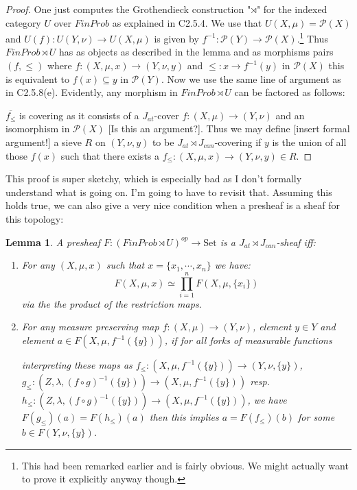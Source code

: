 \documentclass[a4paper]{amsproc}
\theoremstyle{plain}
\newtheorem{lemma}[theorem]{Lemma}
\theoremstyle{definition}
\theoremstyle{remark}
\numberwithin{equation}{section}
\begin{document}
\begin{proof}
One just computes the Grothendieck construction "$\rtimes$" for the indexed category $U$ over $FinProb$ as explained in C2.5.4. We use that $U(X,\mu)=\mathcal{P}(X)$ and $U(f):U(Y,\nu)\rightarrow U(X,\mu)$ is given by $f^{-1}:\mathcal{P}(Y)\rightarrow \mathcal{P}(X)$.\footnote{This had been remarked earlier and is fairly obvious. We might actually want to prove it explicitly anyway though.} Thus $FinProb\rtimes U$ has as objects as described in the lemma and as morphisms pairs $(f,\leq)$ where $f:(X,\mu, x)\rightarrow (Y,\nu, y)$ and $\leq: x\rightarrow f^{-1}(y)$ in $\mathcal{P}(X)$ this is equivalent to $f(x)\subseteq y$ in $\mathcal{P}(Y)$. Now we use the same line of argument as in C2.5.8(e). Evidently, any morphism in $FinProb\rtimes U$ can be factored as follows:
\begin{center}
\end{center} 
$\overline{f_{\leq}}$ is covering as it consists of a $J_{at}$-cover $f:(X,\mu)\rightarrow (Y,\nu)$ and an isomorphism in $\mathcal{P}(X)$ [Is this an argument?]. Thus we may define [insert formal argument!] a sieve $R$ on $(Y,\nu,y)$ to be $J_{at}\rtimes J_{can}$-covering if $y$ is the union of all those $f(x)$ such that there exists a $f_{\leq}:(X,\mu,x)\rightarrow (Y,\nu,y)\in R$.
\end{proof}
This proof is super sketchy, which is especially bad as I don't formally understand what is going on. I'm going to have to revisit that. Assuming this holds true, we can also give a very nice condition when a presheaf is a sheaf for this topology:
\begin{lemma} A presheaf $F:(FinProb\rtimes U)^{op}\rightarrow \text{Set}$ is a $J_{at}\rtimes J_{can}$-sheaf iff:
\begin{enumerate}
\item For any $(X,\mu,x)$ such that $x=\{x_1,\cdots, x_n \}$ we have:
\[F(X,\mu,x)\simeq \prod_{i=1}^n F(X,\mu,\{x_ i \})   \]
via the the product of the restriction maps.
\item For any measure preserving map $f:(X,\mu)\rightarrow (Y,\nu)$, element $y\in Y$ and element $a\in F(X,\mu, f^{-1}(\{y\}))$, if for all forks of measurable functions
\begin{center}
\end{center}
interpreting these maps as $f_{\leq}:(X,\mu,f^{-1}(\{y\}))\rightarrow (Y,\nu,\{y\})$, $g_{\leq}:(Z,\lambda, (f\circ g)^{-1}(\{ y\} ))\rightarrow (X,\mu, f^{-1}(\{ y \}))$ resp. $h_{\leq}:(Z,\lambda, (f\circ g)^{-1}(\{ y\} ))\rightarrow (X,\mu, f^{-1}(\{ y \}))$, we have $F(g_{\leq})(a)=F(h_{\leq})(a)$ then this implies $a=F(f_{\leq})(b)$ for some $b\in F(Y,\nu, \{y\})$.
\end{enumerate}
\end{lemma}
\end{document}
